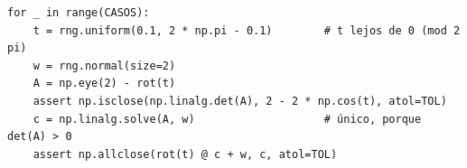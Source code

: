 %
\begin{lstlisting}
for _ in range(CASOS):
    t = rng.uniform(0.1, 2 * np.pi - 0.1)        # t lejos de 0 (mod 2 pi)
    w = rng.normal(size=2)
    A = np.eye(2) - rot(t)
    assert np.isclose(np.linalg.det(A), 2 - 2 * np.cos(t), atol=TOL)
    c = np.linalg.solve(A, w)                    # único, porque det(A) > 0
    assert np.allclose(rot(t) @ c + w, c, atol=TOL)
\end{lstlisting}
\comprobacionPie
